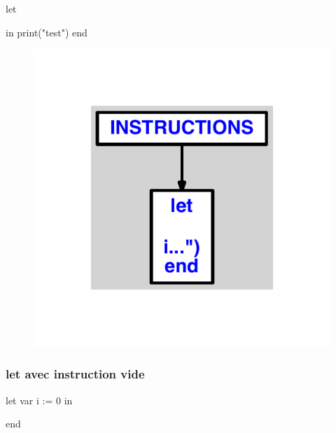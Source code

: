 \documentclass{article}
\begin{document}
\begin{verbatimtab}
let

in
	print("test")
end
\end{verbatimtab}
\begin{figure}[H]\centering\includegraphics[max width=\textwidth]{ast/ast_261.pdf}\end{figure}\subsubsection{let avec instruction vide}
\begin{verbatimtab}
let
	var i := 0
in

end
\end{verbatimtab}
\end{document}

